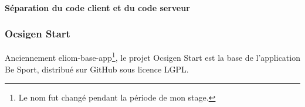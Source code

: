 \paragraph*{Séparation du code client et du code serveur}


\subsubsection*{Ocsigen Start}

Anciennement eliom-base-app\footnote{Le nom fut changé pendant la période de
  mon stage.}, le projet Ocsigen Start\cite{ocsigen-start-github} est la base de
l'application Be Sport, distribué sur GitHub sous licence LGPL.